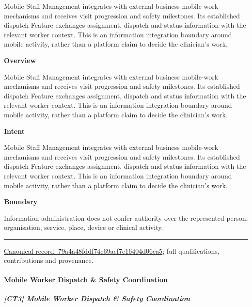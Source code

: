 Mobile Staff Management integrates with external business mobile-work mechanisms and receives visit progression and safety milestones. Its established dispatch Feature exchanges assignment, dispatch and status information with the relevant worker context. This is an information integration boundary around mobile activity, rather than a platform claim to decide the clinician's work.



\textbf{Overview}



Mobile Staff Management integrates with external business mobile-work mechanisms and receives visit progression and safety milestones. Its established dispatch Feature exchanges assignment, dispatch and status information with the relevant worker context. This is an information integration boundary around mobile activity, rather than a platform claim to decide the clinician's work.



\textbf{Intent}



Mobile Staff Management integrates with external business mobile-work mechanisms and receives visit progression and safety milestones. Its established dispatch Feature exchanges assignment, dispatch and status information with the relevant worker context. This is an information integration boundary around mobile activity, rather than a platform claim to decide the clinician's work.



\textbf{Boundary}



Information administration does not confer authority over the represented person, organisation, service, place, device or clinical activity.



\medskip\hrule\medskip

{\footnotesize \href{../../../../continuum/strategy/capability/79a4a48fddf74c69acf7e16404d06ea5.md}{Canonical record: 79a4a48fddf74c69acf7e16404d06ea5}; full qualifications, contributions and provenance.}\par
\paragraph{Mobile Worker Dispatch \& Safety Coordination}

\subparagraph{[CT3] Mobile Worker Dispatch \& Safety Coordination}

